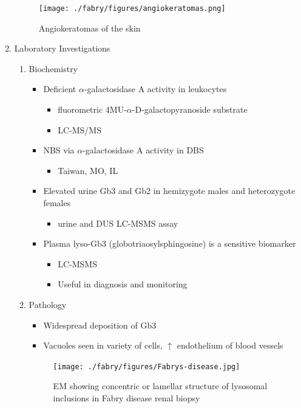 \documentclass{scrartcl}
\begin{document}
\begin{enumerate}
{\begin{figure}[htbp]
\centering
\texttt{[image: ./fabry/figures/angiokeratomas.png]}
\caption[Angiokeratomas of the skin]{\label{fig:org75b816d}
Angiokeratomas of the skin}
\end{figure}}



\item Laboratory Investigations
\label{sec:org433d0ab}

\begin{enumerate}
\item Biochemistry
\label{sec:org199aad8}
\begin{itemize}
\item Deficient \(\alpha\)-galactosidase A activity in leukocytes
\begin{itemize}
\item fluorometric 4MU-\(\alpha\)-D-galactopyranoside substrate
\item LC-MS/MS
\end{itemize}
\item NBS via \(\alpha\)-galactosidase A activity in DBS
\begin{itemize}
\item Taiwan, MO, IL
\end{itemize}
\item Elevated urine Gb3 and Gb2 in hemizygote males and heterozygote females
\begin{itemize}
\item urine and DUS LC-MSMS assay
\end{itemize}
\item Plasma lyso-Gb3 (globotriaosylsphingosine) is a sensitive biomarker
\begin{itemize}
\item LC-MSMS
\item Useful in diagnosis and monitoring
\end{itemize}
\end{itemize}

\item Pathology
\label{sec:org4e52a0c}

\begin{itemize}
\item Widespread deposition of Gb3
\item Vacuoles seen in variety of cells, \(\uparrow\) endothelium of blood vessels
\end{itemize}

\begin{figure}[htbp]
\centering
\texttt{[image: ./fabry/figures/Fabrys-disease.jpg]}
\caption[Fabry EM]{\label{fig:orga22e8e0}
EM showing concentric or lamellar structure of lysosomal inclusions in Fabry disease renal biopsy}
\end{figure}
\end{enumerate}


\end{enumerate}
\end{document}
